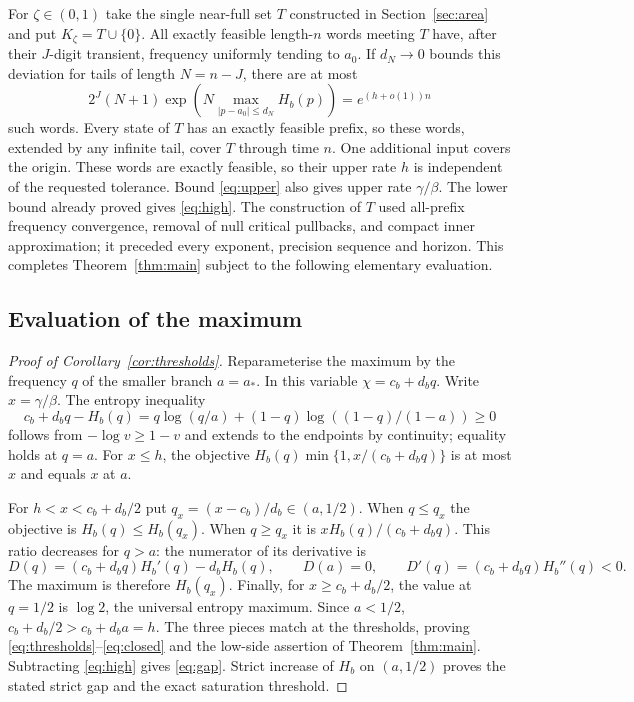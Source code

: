 \documentclass[11pt]{amsart}
\theoremstyle{definition}
\theoremstyle{remark}
\numberwithin{equation}{section}
\begin{document}
For $\zeta\in(0,1)$ take the single near-full set $T$ constructed
in Section~\ref{sec:area} and put $K_\zeta=T\cup\{0\}$.
All exactly feasible length-$n$ words meeting $T$ have,
after their $J$-digit transient, frequency uniformly tending to
$a_0$. If $d_N\to0$ bounds this deviation for tails of length
$N=n-J$, there are at most
\[
2^J(N+1)\exp\!\left(
N\max_{|p-a_0|\le d_N} H_b(p)\right)=e^{(h+o(1))n}
\]
such words. Every state of $T$ has an exactly feasible prefix,
so these words, extended by any infinite tail, cover $T$
through time $n$. One additional input covers the origin.
These words are exactly feasible, so their upper rate $h$ is
independent of the requested tolerance. Bound \eqref{eq:upper} also
gives upper rate $\gamma/\beta$. The lower bound already proved
gives \eqref{eq:high}. The construction of $T$ used all-prefix frequency convergence,
removal of null critical pullbacks, and compact inner approximation;
it preceded every exponent, precision sequence and horizon.
This completes Theorem~\ref{thm:main} subject to the following
elementary evaluation.

\subsection{Evaluation of the maximum}
\begin{proof}[Proof of Corollary~\ref{cor:thresholds}]
Reparameterise the maximum by the frequency $q$ of the smaller
branch $a=a_*$. In this variable $\chi=c_b+d_bq$.
Write $x=\gamma/\beta$. The entropy inequality
\[
c_b+d_bq-H_b(q)=
q\log(q/a)+(1-q)\log((1-q)/(1-a))\ge0
\]
follows from $-\log v\ge1-v$ and extends to the endpoints
by continuity; equality holds at $q=a$.
For $x\le h$, the objective
$H_b(q)\min\{1,x/(c_b+d_bq)\}$ is at most $x$
and equals $x$ at $a$.

For $h<x<c_b+d_b/2$ put $q_x=(x-c_b)/d_b\in(a,1/2)$.
When $q\le q_x$ the objective is $H_b(q)\le H_b(q_x)$.
When $q\ge q_x$ it is $xH_b(q)/(c_b+d_bq)$.
This ratio decreases for $q>a$: the numerator of its
derivative is
\[
D(q)=(c_b+d_bq)H_b'(q)-d_bH_b(q),\qquad
D(a)=0,\qquad D'(q)=(c_b+d_bq)H_b''(q)<0.
\]
The maximum is therefore $H_b(q_x)$.
Finally, for $x\ge c_b+d_b/2$, the value at $q=1/2$ is
$\log2$, the universal entropy maximum.
Since $a<1/2$, $c_b+d_b/2>c_b+d_ba=h$.
The three pieces match at the thresholds, proving
\eqref{eq:thresholds}--\eqref{eq:closed} and the low-side assertion
of Theorem~\ref{thm:main}.
Subtracting \eqref{eq:high} gives \eqref{eq:gap}.
Strict increase of $H_b$ on $(a,1/2)$ proves the stated
strict gap and the exact saturation threshold.
\end{proof}
\end{document}
